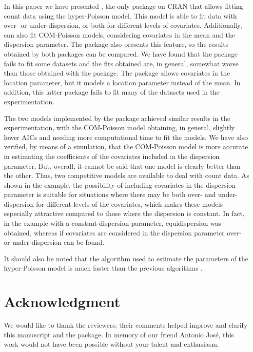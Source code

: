 In this paper we have presented , the only package on CRAN that allows fitting count data using the hyper-Poisson model. This model is able to fit data with over- or under-dispersion, or both for different levels of covariates. Additionally,  can also fit COM-Poisson models, considering covariates in the mean  and the dispersion parameter. The  package also presents this feature, so the results obtained by both packages can be compared. We have found that the  package fails to fit some datasets and the fits obtained are, in general, somewhat worse than those obtained with the   package.
The  package allows covariates in the location parameter, but it models a location parameter instead of the mean. In addition, this latter package fails to fit
many of the datasets used in the experimentation.

The two models implemented by the  package achieved similar results in the experimentation, with the COM-Poisson model obtaining, in general, slightly lower AICs and needing more computational time to fit the models. We have also verified, by means of a simulation, that the COM-Poisson model is more accurate in estimating the coefficients of the covariates included in the dispersion parameter. But, overall, it cannot be said that one model is clearly better than the other. Thus, two competitive models are available to deal with count data. As shown in the example, the possibility of including covariates in the dispersion parameter is suitable for situations where there may be both over- and under-dispersion for different levels of the covariates, which makes these models especially attractive compared to those where the dispersion is constant. In fact, in the example with a constant dispersion parameter, equidispersion was obtained, whereas if covariates are considered in the dispersion parameter over- or under-dispersion can be found.

It should also be noted that the algorithm used to estimate the parameters of the hyper-Poisson model is much faster than the previous algorithms \citep{huang, hp}.

\section{Acknowledgment}

We would like to thank the reviewers; their comments helped improve and clarify this manuscript and the package. In memory of our friend Antonio Jos\'{e}, this work would not have been possible without your talent and enthusiasm.


